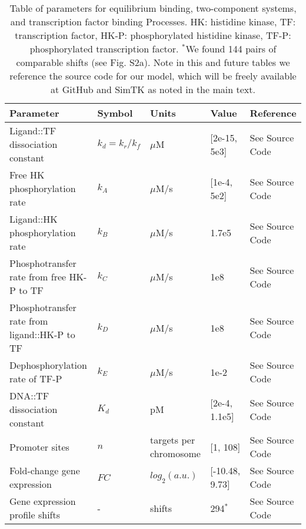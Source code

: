 \documentclass[12pt]{article}
\begin{document}
\begin{table}[h!]
 \centering
 \label{transcription_regulation_table}
 \begin{tabular}{p{2in} p{0.8in} p{0.9in} p{1in} p{0.75in}} 
 \hline
 Parameter & Symbol & Units & Value & Reference \\
 \hline
Ligand::TF dissociation constant & $k_d = k_r/k_f$ & $\mu$M & [2e-15, 5e3] & See Source Code   \\
Free HK phosphorylation rate & $k_A$ & $\mu$M/s & [1e-4, 5e2] & See Source Code  \\
Ligand::HK phosphorylation rate & $k_B$ & $\mu$M/s & 1.7e5 & See Source Code  \\
Phosphotransfer rate from free HK-P to TF & $k_C$ & $\mu$M/s & 1e8 & See Source Code  \\
Phosphotransfer rate from ligand::HK-P to TF & $k_D$ & $\mu$M/s & 1e8 & See Source Code  \\
Dephosphorylation rate of TF-P & $k_E$ & $\mu$M/s & 1e-2 & See Source Code  \\
DNA::TF dissociation constant & $K_d$ & pM & [2e-4, 1.1e5] & See Source Code  \\
Promoter sites & $n$ & targets per chromosome & [1, 108] & See Source Code  \\
Fold-change gene expression & $FC$ & $log_{2}(a.u.)$ & [-10.48, 9.73] & See Source Code  \\
Gene expression profile shifts & - & shifts & 294$^{*}$ & See Source Code  \\

 \hline
\end{tabular}
\caption[Table of parameters for transcription regulation]{Table of parameters for equilibrium binding, two-component systems, and transcription factor binding Processes. HK: histidine kinase, TF: transcription factor, HK-P: phosphorylated histidine kinase, TF-P: phosphorylated transcription factor. $^{*}$We found 144 pairs of comparable shifts (see Fig. S2a). Note in this and future tables we reference the source code for our model, which will be freely available at GitHub and SimTK as noted in the main text.}
\end{table}

\newpage

\label{sec:references}


\end{document}
